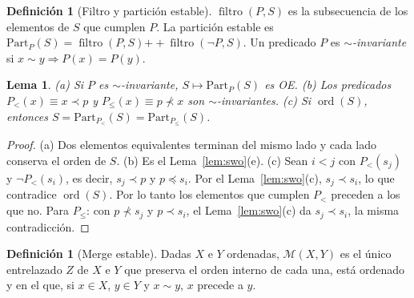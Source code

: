 \documentclass[10pt,a4paper]{article}
\theoremstyle{plain}
\newtheorem{lema}[teorema]{Lema}
\theoremstyle{definition}
\newtheorem{definicion}[teorema]{Definición}
\theoremstyle{remark}
\newcommand{\lt}{\prec}
\newcommand{\nlt}{\not\prec}
\newcommand{\les}{\preccurlyeq}
\newcommand{\eqv}{\sim}
\newcommand{\cat}{\mathbin{+\!\!+}}
\newcommand{\filt}{\operatorname{filtro}}
\newcommand{\Mrg}{\mathcal{M}}
\newcommand{\sortd}{\operatorname{ord}}
\begin{document}
\begin{definicion}[Filtro y partición estable]
$\filt(P,S)$ es la subsecuencia de los elementos de $S$ que cumplen $P$. La partición
estable es $\mathrm{Part}_P(S)=\filt(P,S)\cat\filt(\neg P,S)$. Un predicado $P$ es
\emph{$\eqv$-invariante} si $x\eqv y\Rightarrow P(x)=P(y)$.
\end{definicion}

\begin{lema}\label{lem:part}
(a) Si $P$ es $\eqv$-invariante, $S\mapsto\mathrm{Part}_P(S)$ es OE.
(b) Los predicados $P_<(x)\equiv x\lt p$ y $P_\le(x)\equiv p\nlt x$ son
$\eqv$-invariantes.
(c) Si $\sortd(S)$, entonces $S=\mathrm{Part}_{P_<}(S)=\mathrm{Part}_{P_\le}(S)$.
\end{lema}
\begin{proof}
(a) Dos elementos equivalentes terminan del mismo lado y cada lado conserva el orden
de $S$. (b) Es el Lema~\ref{lem:swo}(e). (c) Sean $i<j$ con $P_<(s_j)$ y
$\neg P_<(s_i)$, es decir, $s_j\lt p$ y $p\les s_i$. Por el Lema~\ref{lem:swo}(c),
$s_j\lt s_i$, lo que contradice $\sortd(S)$. Por lo tanto los elementos que cumplen
$P_<$ preceden a los que no. Para $P_\le$: con $p\nlt s_j$ y $p\lt s_i$, el
Lema~\ref{lem:swo}(c) da $s_j\lt s_i$, la misma contradicción.
\end{proof}

\begin{definicion}[Merge estable]\label{def:merge}
Dadas $X$ e $Y$ ordenadas, $\Mrg(X,Y)$ es el único entrelazado $Z$ de $X$ e $Y$ que
preserva el orden interno de cada una, está ordenado y en el que, si $x\in X$,
$y\in Y$ y $x\eqv y$, $x$ precede a $y$.
\end{definicion}
\end{document}
